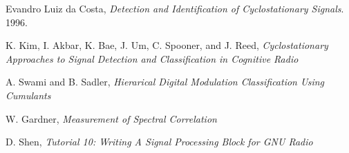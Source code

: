 \begin{thebibliography}{9}

  Evandro Luiz da Costa,
  \emph{Detection and Identification of Cyclostationary Signals}.
  1996.

  K. Kim, I. Akbar, K. Bae, J. Um, C. Spooner, and J. Reed,
  \emph{Cyclostationary Approaches to Signal Detection and Classification in
  Cognitive Radio}

  A. Swami and B. Sadler,
  \emph{Hierarical Digital Modulation Classification Using Cumulants}
  
  W. Gardner,
  \emph{Measurement of Spectral Correlation}

  D. Shen,
  \emph{Tutorial 10: Writing A Signal Processing Block for GNU Radio}


\end{thebibliography}